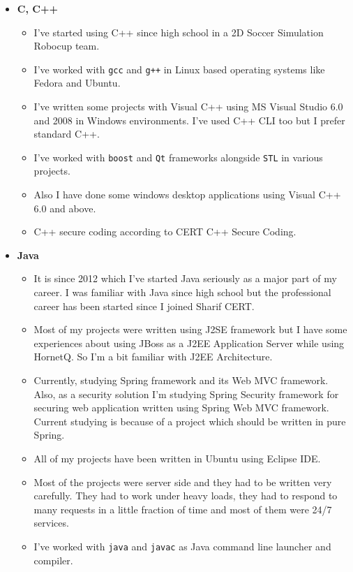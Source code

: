 \documentclass[12pt,a4paper]{article}
\begin{document}
		\begin{itemize}
			\item \textbf{C, C++}
				\begin{itemize}
					\item I've started using C++ since high school in a 2D Soccer Simulation Robocup team.
					\item I've worked with \texttt{gcc} and \texttt{g++} in Linux based operating systems like Fedora and Ubuntu.
					\item I've written some projects with Visual C++ using MS Visual Studio 6.0 and 2008 in Windows environments. I've used C++ CLI too but I prefer standard C++.
					\item I've worked with \texttt{boost} and \texttt{Qt} frameworks alongside \texttt{STL} in various projects.
					\item Also I have done some windows desktop applications using Visual C++ 6.0 and above.
					\item C++ secure coding according to CERT C++ Secure Coding.
				\end{itemize}
			\item \textbf{Java}
				\begin{itemize}
					\item It is since 2012 which I've started Java seriously as a major part of my career. I was familiar with Java since high school but the professional career has been started since I joined Sharif CERT.
					\item Most of my projects were written using J2SE framework but I have some experiences about using JBoss as a J2EE Application Server while using HornetQ. So I'm a bit familiar with J2EE Architecture.
					\item Currently, studying Spring framework and its Web MVC framework. Also, as a security solution I'm studying Spring Security framework for securing web application written using Spring Web MVC framework. Current studying is because of a project which should be written in pure Spring.
					\item All of my projects have been written in Ubuntu using Eclipse IDE.
					\item Most of the projects were server side and they had to be written very carefully. They had to work under heavy loads, they had to respond to many requests in a little fraction of time and most of them were 24/7 services.
					\item I've worked with \texttt{java} and \texttt{javac} as Java command line launcher and compiler.

\end{itemize}
\end{itemize}
\end{document}
